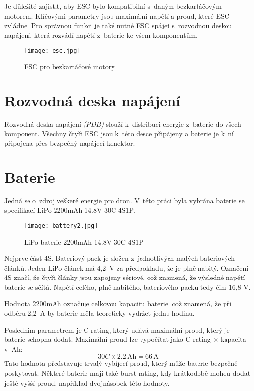\documentclass[12pt]{report}
\begin{document}
Je důležité zajistit, aby ESC bylo kompatibilní s~daným bezkartáčovým motorem. Klíčovými parametry jsou maximální napětí a proud, které ESC zvládne. Pro správnou funkci je také nutné ESC spájet s~rozvodnou deskou napájení, která rozvádí napětí z~baterie ke všem komponentům.

\begin{figure}[H]
	\centering
	\texttt{[image: esc.jpg]}
	\caption{ESC pro bezkartáčové motory}
	\label{fig:esc.jpg}
\end{figure}

\section{Rozvodná deska napájení}
Rozvodná deska napájení \textit{(PDB)} slouží k~distribuci energie z~baterie do všech komponent. Všechny čtyři ESC jsou k~této desce připájeny a baterie je k~ní připojena přes bezpečný napájecí konektor.

\section[Baterie]{Baterie}
Jedná se o~zdroj veškeré energie pro dron. V~této práci byla vybrána baterie se specifikací LiPo 2200mAh 14.8V 30C 4S1P.

\begin{figure}[H]
	\centering
	\texttt{[image: battery2.jpg]}
	\caption{LiPo baterie 2200mAh 14.8V 30C 4S1P}
	\label{fig:battery2.jpg}
\end{figure}

Nejprve část 4S. Bateriový pack je složen z~jednotlivých malých bateriových článků. Jeden LiPo článek má 4,2~V za předpokladu, že je plně nabitý. Označení 4S značí, že čtyři články jsou zapojeny sériově, což znamená, že výsledné napětí baterie se sčítá. Napětí celého, plně nabitého, bateriového packu tedy činí 16,8 V.

Hodnota 2200mAh označuje celkovou kapacitu baterie, což znamená, že při odběru 2,2~A by baterie měla teoreticky vydržet jednu hodinu.

Posledním parametrem je C-rating, který udává maximální proud, který je baterie schopna dodat. Maximální proud lze vypočítat jako C-rating × kapacita v~Ah:
\[
30C \times 2.2\,\text{Ah} = 66\,\text{A}
\]
Tato hodnota představuje trvalý vybíjecí proud, který může baterie bezpečně poskytovat. Některé baterie mají také burst rating, kdy krátkodobě mohou dodat ještě vyšší proud, například dvojnásobek této hodnoty.
\end{document}

